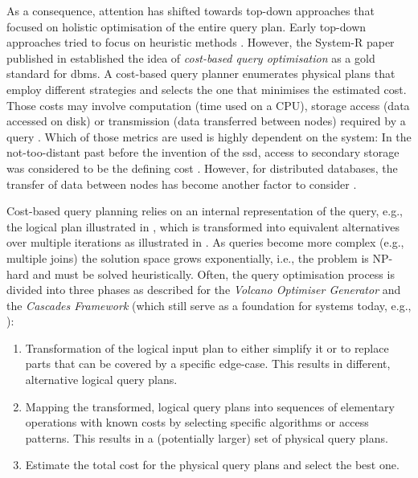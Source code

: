 As a consequence, attention has shifted towards top-down approaches that focused on holistic optimisation of the entire query plan. Early top-down approaches tried to focus on heuristic methods \cite{Jarke:1984Query}. However, the System-R paper \cite{Selinger:1979Access} published in \citeyear{Selinger:1979Access} established the idea of \emph{cost-based query optimisation} as a gold standard for \acrshort{dbms}. A cost-based query planner enumerates physical plans that employ different strategies and selects the one that minimises the estimated cost. Those costs may involve computation (time used on a CPU), storage access (data accessed on disk) or transmission (data transferred between nodes) required by a query \cite{Jarke:1984Query,Garcia:2009Database}. Which of those metrics are used is highly dependent on the system: In the not-too-distant past before the invention of the \acrfull{ssd}, access to secondary storage was considered to be the defining cost \cite{Garcia:2009Database}. However, for distributed databases, the transfer of data between nodes has become another factor to consider \cite{Franklin:1996Performance,Bruno2013:Continuous}.

Cost-based query planning relies on an internal representation of the query, e.g., the logical plan illustrated in , which is transformed into equivalent alternatives over multiple iterations as illustrated in . As queries become more complex (e.g., multiple joins) the solution space grows exponentially, i.e., the problem is NP-hard and must be solved heuristically. Often, the query optimisation process is divided into three phases as described for the \emph{Volcano Optimiser Generator}  \cite{Jarke:1984Query,Graefe:1993Volcano} and the \emph{Cascades Framework} \cite{Graefe:1995Cascades} (which still serve as a foundation for systems today, e.g., \cite{Soliman:Orca2014,Begoli:2018Apache}):

\begin{enumerate}
    \item Transformation of the logical input plan to either simplify it or to replace parts that can be covered by a specific edge-case. This results in different, alternative logical query plans.
    \item Mapping the transformed, logical query plans into sequences of elementary operations with known costs by selecting specific algorithms or access patterns. This results in a (potentially larger) set of physical query plans.
    \item Estimate the total cost for the physical query plans and select the best one.
\end{enumerate}

